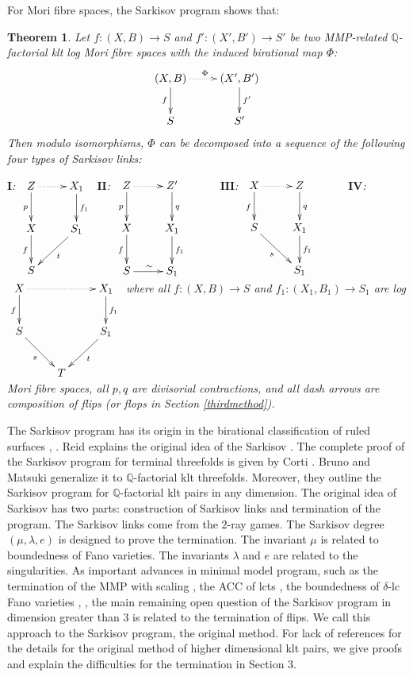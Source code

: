 \documentclass[11pt]{amsart}
\newtheorem{thm}[defn]{Theorem}
\begin{document}
For Mori fibre spaces, the Sarkisov program shows that:
\begin{thm}\label{main}
  Let $ f:(X,B)\to S$ and $f':(X',B')\to S' $ be two MMP-related $ \mathbb{Q} $-factorial klt log Mori fibre spaces with the induced  birational map $\Phi$:
  \[ \xymatrix{
    (X,B)\ar[d]_f\ar@{.>}[r]^\Phi&(X',B')\ar[d]^{f'}\\
    S&S'} \]
  Then modulo isomorphisms, $ \Phi  $ can be decomposed into a sequence of the following four types of Sarkisov links:


  $\textbf{I}$:
  $\xymatrix{
    Z\ar[d]_p\ar@{.>}[r]&X_1\ar[d]^{f_1}\\
    X\ar[d]_f&S_1\ar[dl]^{t}\\
  S &}$
  $\textbf{II}$:
  $\xymatrix{
    Z\ar[d]_p\ar@{.>}[r]&Z'\ar[d]^{q}&\\
    X\ar[d]_{f}&X_1\ar[d]^{f_1}\\
    S\ar[r]^{\sim}&S_1}$
  $\textbf{III}$:
  $
  \xymatrix{
    X\ar@{.>}[r]\ar[d]_f& Z\ar[d]^q& \\
    S\ar[rd]_{s}         & X_{1}\ar[d]^{f_{1}}&\\
    &S_{1}
  }
  $
  $\textbf{IV}$:
  $\xymatrix{
    X\ar[d]_f\ar@{.>}[rr]&&X_1\ar[d]^{f_1}\\
    S\ar[dr]_{s}&&S_1\ar[dl]^{t}\\
    &T &}$
    where all $ f:(X,B)\to S $ and $ f_1:(X_1,B_1)\to S_1 $ are log Mori fibre spaces, all $ p,q $ are divisorial contractions, and all dash arrows are composition of flips (or flops in Section \ref{thirdmethod}). 
  \end{thm}

The Sarkisov program has its origin in the birational classification of ruled surfaces \cite{sarkisovBIRATIONALAUTOMORPHISMSCONIC1981}, \cite{sarkisovCONICBUNDLESTRUCTURES1983}. 
Reid \cite{reidBirationalgeometry} explains the original idea of the Sarkisov \cite{sarkisovBirationalmapsofstandardQfanoFibering}. 
The complete proof of the Sarkisov program for terminal threefolds is given  by Corti \cite{cortiFactoringBirationalMaps}. 
Bruno and Matsuki \cite{brunoLogSarkisovProgram1995} generalize it to $\mathbb{Q}$-factorial klt threefolds. Moreover, they outline the Sarkisov program for $\mathbb{Q}$-factorial klt pairs in any dimension. The original idea of Sarkisov has two parts: construction of Sarkisov links and termination of the program. The Sarkisov links come from the $2$-ray games. The Sarkisov degree $(\mu,\lambda, e)$ is designed to prove the termination. The invariant $\mu$ is related to boundedness of Fano varieties. The invariants $\lambda$ and $e$ are related to the singularities.
As important advances in minimal model program, such as the termination of the MMP with scaling \cite{BCHM10}, the ACC of lcts \cite{HMX14}, the boundedness of $\delta$-lc Fano varieties \cite{Bir19}, \cite{birkarSingularitiesLinearSystems2020}, the main  remaining  open question of the  Sarkisov program in dimension greater than 3 is related to the termination of flips. We call this approach to the Sarkisov program, the original method. For lack of references for the details for the original method of higher dimensional klt pairs, we give proofs and explain the difficulties for the termination in Section 3. 
\end{document}
